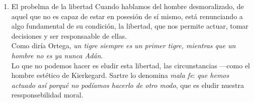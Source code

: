 \documentclass[11pt]{article}
\begin{document}
\begin{enumerate}
Se remite a la ética griega arcaica presocrática y de la idea del
hombre virtuoso como héroe o guerrero.\\
Las parte buena y la parte mala:\\
Por un lado, nos conduce a un planteamiento muy individualista. El
poder indivdual, de la capacidad de acción a ultranza que no
necesariamente se cumple o es posible, ya que muchas veces estamos
atados a condicionamientos sociales, o un contexto desfavorable por
tal dinámica.\\
Mucahs veces es más fácil tener una lectura negativa de la libretad,
en cuanto lo que no podemos hacer que lo que sí podemos hacer y de la
capacidad de acción que podamos tener.\\
Así, esta idea de que lo que hace que podamos adoptar una conducta
ética mediante el estar e posesión de nosotros mismos, sí pero la
voluntad no lo es todo y la capacidad de acción puede ser limitada.
\item El probelma de la libertad
\label{sec:org6f0bfdd}
Cuando hablamos del hombre desmoralizado, de aquel que no es capaz de
estar en posesión de sí mismo, está renunciando a algo fundamental de
su condición, la libertad, que nos permite actuar, tomar decisiones y
ser responsaable de ellas.\\
Como diría Ortega, \emph{un tigre siempre es un primer tigre, mientras que
un hombre no es ya nunca Adán}.\\

Lo que no podemos hacer es eludir esta libertad, las circunstancias
---como el hombre estético de Kierkegard. Sartre lo denomina \emph{mala
fe}: \emph{que hemos actuado así porqué no podíamos hacerlo de otro modo},
que es eludir nuestra ressponsebilidad moral.
\end{enumerate}
\end{document}
